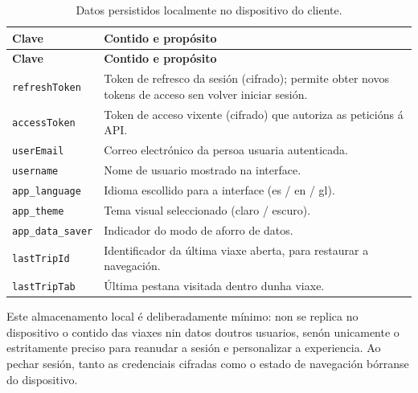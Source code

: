 \begin{longtable}{@{}p{3.6cm}p{10.7cm}@{}}
  \caption{Datos persistidos localmente no dispositivo do cliente.}
  \label{tab:frontend-storage} \\
  \toprule
  \textbf{Clave} & \textbf{Contido e propósito} \\
  \midrule
  \endfirsthead
  \toprule
  \textbf{Clave} & \textbf{Contido e propósito} \\
  \midrule
  \endhead
  \texttt{refreshToken} & Token de refresco da sesión (cifrado); permite obter novos tokens de acceso sen volver iniciar sesión. \\[3pt]
  \texttt{accessToken}  & Token de acceso vixente (cifrado) que autoriza as peticións á API. \\[3pt]
  \texttt{userEmail}    & Correo electrónico da persoa usuaria autenticada. \\[3pt]
  \texttt{username}     & Nome de usuario mostrado na interface. \\[3pt]
  \texttt{app\_language} & Idioma escollido para a interface (es / en / gl). \\[3pt]
  \texttt{app\_theme}    & Tema visual seleccionado (claro / escuro). \\[3pt]
  \texttt{app\_data\_saver} & Indicador do modo de aforro de datos. \\[3pt]
  \texttt{lastTripId}   & Identificador da última viaxe aberta, para restaurar a navegación. \\[3pt]
  \texttt{lastTripTab}  & Última pestana visitada dentro dunha viaxe. \\
  \bottomrule
\end{longtable}

Este almacenamento local é deliberadamente mínimo: non se replica no dispositivo o
contido das viaxes nin datos doutros usuarios, senón unicamente o estritamente preciso
para reanudar a sesión e personalizar a experiencia. Ao pechar sesión, tanto as
credenciais cifradas como o estado de navegación bórranse do dispositivo.

